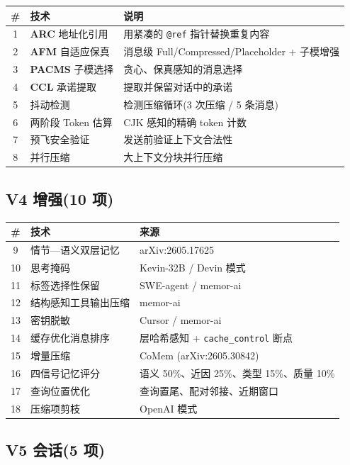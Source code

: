 \documentclass[11pt,a4paper]{article}
\begin{document}
\begin{longtable}{@{}clp{8cm}@{}}
  \toprule
  \# & 技术 & 说明 \\
  \midrule
  1  & \textbf{ARC} 地址化引用 & 用紧凑的 \texttt{@ref} 指针替换重复内容 \\
  2  & \textbf{AFM} 自适应保真 & 消息级 Full/Compressed/Placeholder + 子模增强 \\
  3  & \textbf{PACMS} 子模选择 & 贪心、保真感知的消息选择 \\
  4  & \textbf{CCL} 承诺提取 & 提取并保留对话中的承诺 \\
  5  & 抖动检测 & 检测压缩循环(3 次压缩 / 5 条消息) \\
  6  & 两阶段 Token 估算 & CJK 感知的精确 token 计数 \\
  7  & 预飞安全验证 & 发送前验证上下文合法性 \\
  8  & 并行压缩 & 大上下文分块并行压缩 \\
  \bottomrule
\end{longtable}

\subsection{V4 增强(10 项)}

\begin{longtable}{@{}clp{8cm}@{}}
  \toprule
  \# & 技术 & 来源 \\
  \midrule
  9  & 情节—语义双层记忆 & arXiv:2605.17625 \\
  10 & 思考掩码 & Kevin-32B / Devin 模式 \\
  11 & 标签选择性保留 & SWE-agent / memor-ai \\
  12 & 结构感知工具输出压缩 & memor-ai \\
  13 & 密钥脱敏 & Cursor / memor-ai \\
  14 & 缓存优化消息排序 & 层哈希感知 + \texttt{cache\_control} 断点 \\
  15 & 增量压缩 & CoMem (arXiv:2605.30842) \\
  16 & 四信号记忆评分 & 语义 50\%、近因 25\%、类型 15\%、质量 10\% \\
  17 & 查询位置优化 & 查询置尾、配对邻接、近期窗口 \\
  18 & 压缩项剪枝 & OpenAI 模式 \\
  \bottomrule
\end{longtable}

\subsection{V5 会话(5 项)}
\end{document}
